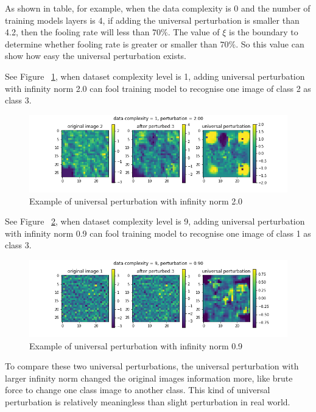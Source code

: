 \documentclass{article}
\begin{document}
As shown in table, for example, when the data complexity is 0 and the number of training models layers is 4, if adding the universal perturbation is smaller than 4.2, then the fooling rate will less than $70\%$. The value of $\xi$ is the boundary to determine whether fooling rate is greater or smaller than $70\%$. So this value can show how easy the universal perturbation exists.

See Figure~ \ref{fig:per2}, when dataset complexity level is 1, adding universal perturbation with infinity norm 2.0 can fool training model to recognise one image of class 2 as class 3.
\begin{figure}[h]
    \centering
    \includegraphics[width=1\linewidth]{model-c1-l4-pb-per2.png}
    \caption{\small Example of universal perturbation with infinity norm 2.0}
    \label{fig:per2}
\end{figure}

See Figure~ \ref{fig:per09}, when dataset complexity level is 9, adding universal perturbation with infinity norm 0.9 can fool training model to recognise one image of class 1 as class 3.
\begin{figure}[h]
    \centering
    \includegraphics[width=1\linewidth]{model-c9-l4-pb-per09.png}
    \caption{\small Example of universal perturbation with infinity norm 0.9}
    \label{fig:per09}
\end{figure}

To compare these two universal perturbations, the universal perturbation with larger infinity norm changed the original images information more, like brute force  to change one class image to another class. This kind of universal perturbation is relatively meaningless than slight perturbation in real world.
\end{document}
